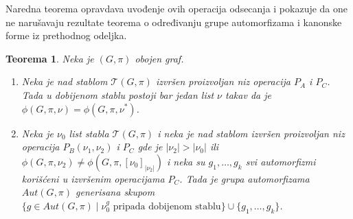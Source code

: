 \documentclass[12pt,oneside]{memoir}
\newtheorem{theorem}{Teorema}
\theoremstyle{definition}
\begin{document}
  Naredna teorema opravdava uvođenje ovih operacija odsecanja i pokazuje da one
  ne narušavaju rezultate teorema o određivanju grupe automorfizama i kanonske
  forme iz prethodnog odeljka.

  \begin{theorem}
	  Neka je $(G, \pi)$ obojen graf.
	  \begin{enumerate}
		  \item Neka je nad stablom $\mathcal{T}(G, \pi)$ izvršen proizvoljan
			  niz operacija $P_A$ i $P_C$. Tada u dobijenom stablu postoji bar
			  jedan list $\nu$ takav da je $\phi(G, \pi, \nu) = \phi(G, \pi,
			  \nu^*)$.
		  \item Neka je $\nu_0$ list stabla $\mathcal{T}(G, \pi)$ i neka je nad
			  stablom izvršen proizvoljan niz operacija $P_B(\nu_1, \nu_2)$ i
			  $P_C$ gde je $|\nu_2| > |\nu_0|$ ili $\phi(G, \pi, \nu_2) \neq
			  \phi(G, \pi, [\nu_0]_{|\nu_2|})$ i neka su $g_1, \dots, g_k$ svi
			  automorfizmi korišćeni u izvršenim operacijama $P_C$.  Tada je
			  grupa automorfizama $Aut(G, \pi)$ generisana skupom $\{g \in
			  Aut(G, \pi) \mid \nu_0^g \text{ pripada dobijenom stablu}\} \cup
			  \{g_1, \dots, g_k\} $.
	  \end{enumerate}
  \end{theorem}
\end{document}
